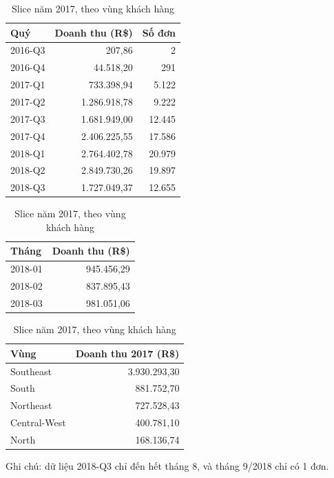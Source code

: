 \documentclass[12pt,a4paper]{report}
\renewcommand{\_}{\oldunderscore\allowbreak}
\begin{document}
\begin{table}[H]
\centering\small
\begin{minipage}[t]{0.5\linewidth}\centering
\caption{Drill-down Năm $\rightarrow$ Quý}
\begin{tabular}{lrr}
\toprule
Quý & Doanh thu (R\$) & Số đơn \\
\midrule
2016-Q3 & 207,86 & 2 \\
2016-Q4 & 44.518,20 & 291 \\
2017-Q1 & 733.398,94 & 5.122 \\
2017-Q2 & 1.286.918,78 & 9.222 \\
2017-Q3 & 1.681.949,00 & 12.445 \\
2017-Q4 & 2.406.225,55 & 17.586 \\
2018-Q1 & 2.764.402,78 & 20.979 \\
2018-Q2 & 2.849.730,26 & 19.897 \\
2018-Q3 & 1.727.049,37 & 12.655 \\
\bottomrule
\end{tabular}
\end{minipage}\hfill
\begin{minipage}[t]{0.46\linewidth}\centering
\caption{Drill-down 2018-Q1 $\rightarrow$ Tháng}
\begin{tabular}{lr}
\toprule
Tháng & Doanh thu (R\$) \\
\midrule
2018-01 & 945.456,29 \\
2018-02 & 837.895,43 \\
2018-03 & 981.051,06 \\
\bottomrule
\end{tabular}

\vspace{0.6em}
\caption{Slice năm 2017, theo vùng khách hàng}
\begin{tabular}{lr}
\toprule
Vùng & Doanh thu 2017 (R\$) \\
\midrule
Southeast & 3.930.293,30 \\
South & 881.752,70 \\
Northeast & 727.528,43 \\
Central-West & 400.781,10 \\
North & 168.136,74 \\
\bottomrule
\end{tabular}
\end{minipage}
\end{table}

Ghi chú: dữ liệu 2018-Q3 chỉ đến hết tháng 8, và tháng 9/2018 chỉ có 1 đơn.
\end{document}
